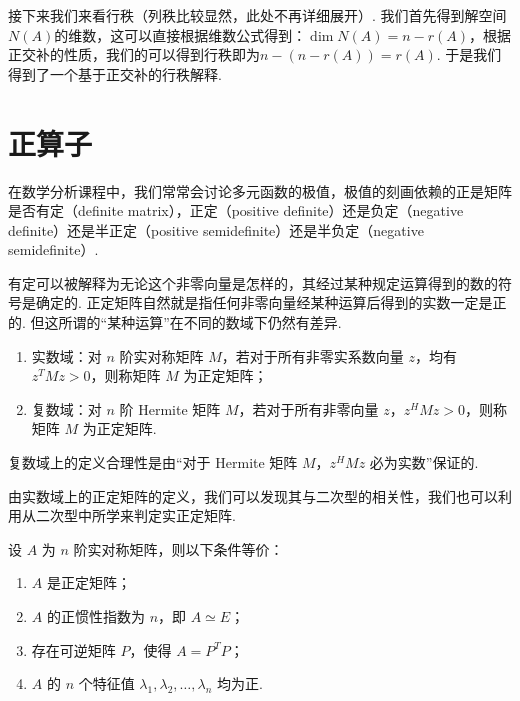 接下来我们来看行秩（列秩比较显然，此处不再详细展开）. 我们首先得到解空间$N(A)$的维数，这可以直接根据维数公式得到：$\dim N(A) = n-r(A)$，根据正交补的性质，我们的可以得到行秩即为$n-(n-r(A))=r(A)$. 于是我们得到了一个基于正交补的行秩解释.

\section{正算子}

在数学分析课程中，我们常常会讨论多元函数的极值，极值的刻画依赖的正是矩阵是否有定（definite matrix），正定（positive definite）还是负定（negative definite）还是半正定（positive semidefinite）还是半负定（negative semidefinite）.

有定可以被解释为无论这个非零向量是怎样的，其经过某种规定运算得到的数的符号是确定的. 正定矩阵自然就是指任何非零向量经某种运算后得到的实数一定是正的. 但这所谓的``某种运算''在不同的数域下仍然有差异.

\begin{definition}[正定矩阵] 
    \begin{enumerate}
        \item 实数域：对 $ n $ 阶实对称矩阵 $ M $，若对于所有非零实系数向量 $ z $，均有$ z^{T}Mz > 0 $，则称矩阵 $ M $ 为正定矩阵；

        \item 复数域：对 $ n $ 阶 Hermite 矩阵 $ M $，若对于所有非零向量 $ z $，$ z^{H}Mz > 0 $，则称矩阵 $ M $ 为正定矩阵.
    \end{enumerate}
\end{definition}

复数域上的定义合理性是由``对于 Hermite 矩阵 $ M $，$ z^{H}Mz $ 必为实数''保证的.

由实数域上的正定矩阵的定义，我们可以发现其与二次型的相关性，我们也可以利用从二次型中所学来判定实正定矩阵.

\begin{theorem}
    设 $ A $ 为 $ n $ 阶实对称矩阵，则以下条件等价：
    \begin{enumerate}
        \item $ A $ 是正定矩阵；

        \item $ A $ 的正惯性指数为 $ n $，即 $ A \simeq E $；

        \item 存在可逆矩阵 $ P $，使得 $ A = P^{T}P $；

        \item $ A $ 的 $ n $ 个特征值 $ \lambda_1, \lambda_2, \ldots, \lambda_n $ 均为正.
    \end{enumerate}
\end{theorem}

